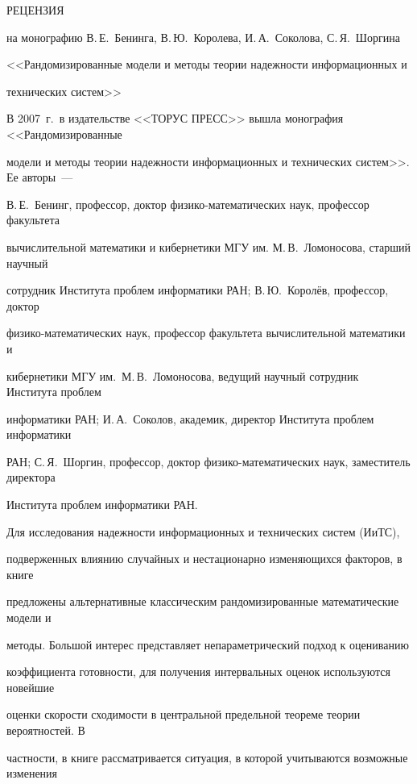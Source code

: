      РЕЦЕНЗИЯ


     на монографию В.\,Е.~Бенинга, В.\,Ю.~Королева, И.\,А.~Соколова, С.\,Я.~Шоргина


     <<Рандомизированные модели и методы теории надежности информационных и 


технических систем>>


     


     В 2007~г.\ в издательстве <<ТОРУС ПРЕСС>> вышла монография <<Рандомизированные 


модели и методы теории надежности информационных и технических систем>>. Ее авторы~--- 


В.\,Е.~Бенинг, профессор, доктор физико-математических наук, профессор факультета 


вычислительной математики и кибернетики МГУ им. М.\,В.~Ломоносова, старший научный 


сотрудник Института проблем информатики РАН; В.\,Ю.~Королёв, профессор, доктор 


     физико-математических наук, профессор факультета вычислительной математики и 


кибернетики МГУ им.\ М.\,В.~Ломоносова, ведущий научный сотрудник Института проблем 


информатики РАН; И.\,А.~Соколов, академик, директор Института проблем информатики 


РАН; С.\,Я.~Шоргин, профессор, доктор физико-математических наук, заместитель директора 


Института проблем информатики РАН. 


     


     Для исследования надежности информационных и технических систем (ИиТС), 


подверженных влиянию случайных и нестационарно изменяющихся факторов, в книге 


предложены альтернативные классическим рандомизированные математические модели и 


методы. Большой интерес представляет непараметрический подход к оцениванию 


коэффициента готовности, для получения интервальных оценок используются новейшие 


оценки скорости сходимости в центральной предельной теореме теории вероятностей. В 


частности, в книге рассматривается ситуация, в которой учитываются возможные изменения 


